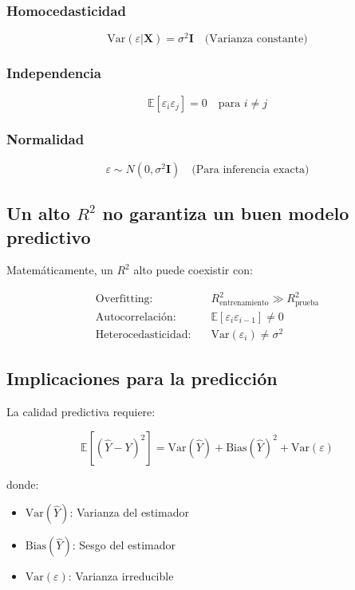 \documentclass[12pt]{article}
\begin{document}
\subsubsection{Homocedasticidad}
\[
\text{Var}(\varepsilon|\mathbf{X}) = \sigma^2\mathbf{I} \quad \text{(Varianza constante)}
\]

\subsubsection{Independencia}
\[
\mathbb{E}[\varepsilon_i\varepsilon_j] = 0 \quad \text{para } i \neq j
\]

\subsubsection{Normalidad}
\[
\varepsilon \sim N(0, \sigma^2\mathbf{I}) \quad \text{(Para inferencia exacta)}
\]

\subsection{Un alto $R^2$ no garantiza un buen modelo predictivo}

Matemáticamente, un $R^2$ alto puede coexistir con:

\begin{align*}
\text{Overfitting:} &\quad R^2_{\text{entrenamiento}} \gg R^2_{\text{prueba}} \\
\text{Autocorrelación:} &\quad \mathbb{E}[\varepsilon_i\varepsilon_{i-1}] \neq 0 \\
\text{Heterocedasticidad:} &\quad \text{Var}(\varepsilon_i) \neq \sigma^2
\end{align*}

\subsection{Implicaciones para la predicción}

La calidad predictiva requiere:

\[
\mathbb{E}[(\hat{Y} - Y)^2] = \text{Var}(\hat{Y}) + \text{Bias}(\hat{Y})^2 + \text{Var}(\varepsilon)
\]

donde:
\begin{itemize}
\item $\text{Var}(\hat{Y})$: Varianza del estimador
\item $\text{Bias}(\hat{Y})$: Sesgo del estimador
\item $\text{Var}(\varepsilon)$: Varianza irreducible
\end{itemize}
\end{document}
